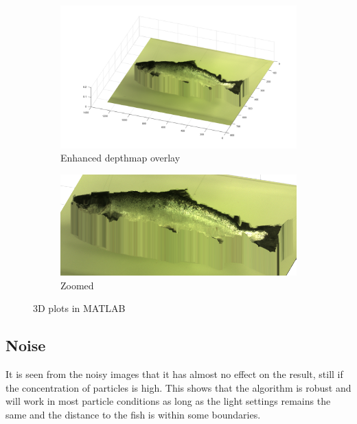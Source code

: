 \begin{figure}[H]
    \medskip
    \begin{subfigure}{0.41\textwidth}
        \includegraphics[width=\linewidth]{images/results/3D_plots/fixed_3D_fish_87}
        \caption{Enhanced depthmap overlay}
    \end{subfigure}\hspace*{\fill}
    \begin{subfigure}{0.57\textwidth}
        \includegraphics[width=\linewidth]{images/results/3D_plots/fixed_3D_fish_63}
        \caption{Zoomed}
    \end{subfigure}
    
    \caption{3D plots in MATLAB} 
    \label{fig:3D_result_87}
\end{figure}



\subsection{Noise}

It is seen from the noisy images that it has almost no effect on the result, still if the concentration of particles is high. This shows that the algorithm is robust and will work in most particle conditions as long as the light settings remains the same and the distance to the fish is within some boundaries.

